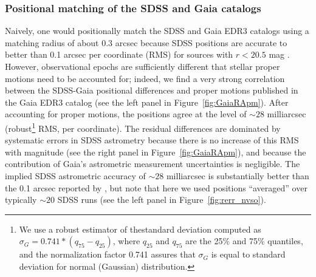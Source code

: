 \documentclass[fleqn,usenatbib]{mnras}
\begin{document}
\subsubsection{Positional matching of the SDSS and Gaia catalogs}
Naively, one would positionally match the SDSS and Gaia EDR3 catalogs using a matching radius of 
about 0.3 arcsec because SDSS positions are accurate to better than 0.1 arcsec per coordinate (RMS) 
for sources with $r < 20.5$ mag \citep{2003AJ....125.1559P}.  However, observational epochs are
sufficiently different that stellar proper motions need to be accounted for; indeed, we find a very 
strong correlation between the SDSS-Gaia positional differences and proper motions published in 
the Gaia EDR3 catalog (see the left panel in  Figure~\ref{fig:GaiaRApm}). After accounting for proper
motions,  the positions agree at the level of $\sim28$ milliarcsec (robust\footnote{We use a robust estimator 
of thestandard deviation computed as $\sigma_G = 0.741*(q_{75}-q_{25})$, where $q_{25}$ and $q_{75}$ are 
the 25\% and 75\% quantiles, and the normalization factor 0.741 assures that $\sigma_G$ is equal to 
standard deviation for normal (Gaussian) distribution.}
RMS, per coordinate). The 
residual differences are dominated by systematic errors in SDSS astrometry because there is
no increase of this RMS with magnitude (see the right panel in Figure~\ref{fig:GaiaRApm}), and
because the contribution of Gaia's astrometric measurement uncertainties is negligible. 
The implied SDSS astrometric accuracy of $\sim28$ milliarcsec is substantially better than 
the 0.1 arcsec reported by \cite{2003AJ....125.1559P}, but note that here we used 
positions ``averaged'' over typically $\sim20$ SDSS runs (see the left panel in Figure~\ref{fig:rerr_nvso}). 
\end{document}
